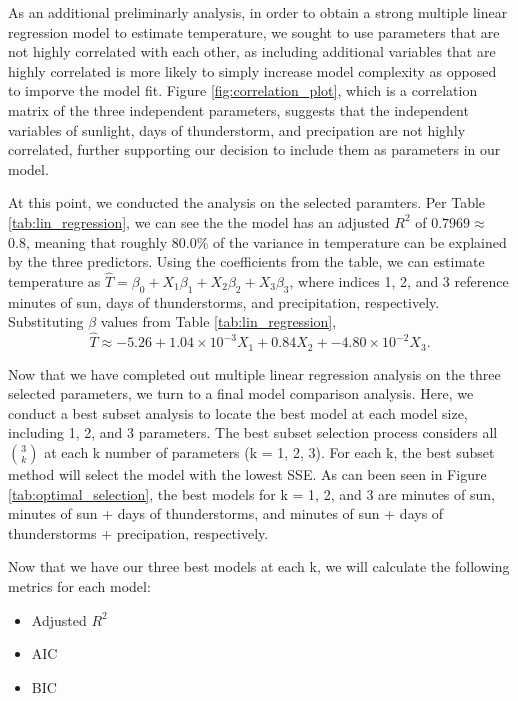 As an additional preliminarly analysis, in order to obtain a strong multiple linear regression model to estimate temperature, we sought to use parameters that are not highly correlated with each other, as including additional variables that are highly correlated is more likely to simply increase model complexity as opposed to imporve the model fit. Figure \ref{fig:correlation_plot}, which is a correlation matrix of the three independent parameters, suggests that the independent variables of sunlight, days of thunderstorm, and precipation are not highly correlated, further supporting our decision to include them as parameters in our model.

At this point, we conducted the analysis on the selected paramters. Per Table \ref{tab:lin_regression}, we can see the the model has an adjusted $R^{2}$ of $0.7969 \approx$ 0.8, meaning that roughly 80.0\% of the variance in temperature can be explained by the three predictors. Using the coefficients from the table, we can estimate temperature as $\hat{T} = \beta_{0} + X_{1}\beta_{1} + X_{2}\beta_{2} + X_{3}\beta_{3}$, where indices 1, 2, and 3 reference minutes of sun, days of thunderstorms, and precipitation, respectively. Substituting $\beta$ values from Table \ref{tab:lin_regression}, $$\hat{T} \approx -5.26 + 1.04 \times 10^{-3}X_{1} + 0.84X_{2} + -4.80\times 10^{-2}X_{3}.$$

Now that we have completed out multiple linear regression analysis on the three selected parameters, we turn to a final model comparison analysis. Here, we conduct a best subset analysis to locate the best model at each model size, including 1, 2, and 3 parameters. The best subset selection process considers all $3 \choose k$ at each k number of parameters (k = 1, 2, 3). For each k, the best subset method will select the model with the lowest SSE. As can been seen in Figure \ref{tab:optimal_selection}, the best models for k = 1, 2, and 3 are minutes of sun, minutes of sun + days of thunderstorms, and minutes of sun + days of thunderstorms + precipation, respectively.

Now that we have our three best models at each k, we will calculate the following metrics for each model: 

\begin{itemize}
	\item Adjusted $R^{2}$
	\item AIC
	\item BIC
\end{itemize}

